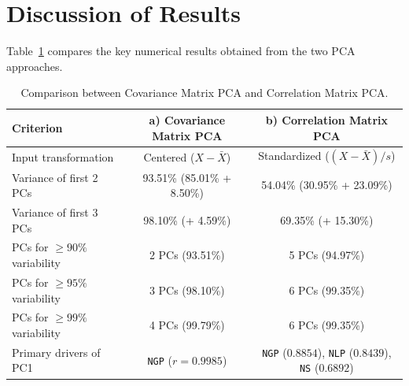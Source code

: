 \documentclass[11pt,a4paper]{article}
\begin{document}
\section{Discussion of Results}

Table~\ref{tab:comparison} compares the key numerical results obtained from the two PCA approaches.

\begin{table}[H]
\centering
\caption{Comparison between Covariance Matrix PCA and Correlation Matrix PCA.}
\label{tab:comparison}
\begin{tabular}{lcc}
\toprule
\textbf{Criterion} & \textbf{a) Covariance Matrix PCA} & \textbf{b) Correlation Matrix PCA} \\
\midrule
Input transformation & Centered ($X - \bar{X}$) & Standardized ($(X - \bar{X})/s$) \\
Variance of first 2 PCs & 93.51\% (85.01\% + 8.50\%) & 54.04\% (30.95\% + 23.09\%) \\
Variance of first 3 PCs & 98.10\% (+ 4.59\%) & 69.35\% (+ 15.30\%) \\
PCs for $\ge 90\%$ variability & 2 PCs (93.51\%) & 5 PCs (94.97\%) \\
PCs for $\ge 95\%$ variability & 3 PCs (98.10\%) & 6 PCs (99.35\%) \\
PCs for $\ge 99\%$ variability & 4 PCs (99.79\%) & 6 PCs (99.35\%) \\
Primary drivers of PC1 & \texttt{NGP} ($r = 0.9985$) & \texttt{NGP} ($0.8854$), \texttt{NLP} ($0.8439$), \texttt{NS} ($0.6892$) \\
\bottomrule
\end{tabular}
\end{table}
\end{document}
